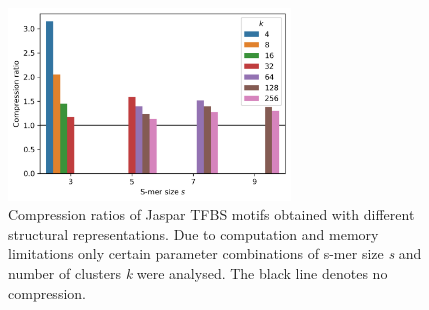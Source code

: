 \documentclass[10pt]{article}
\begin{document}
\begin{figure}[ht]
  \centering
  \includegraphics[width=7.5cm,keepaspectratio]{smer_fig_compression.png}
  \caption{Compression ratios of Jaspar TFBS motifs obtained with different structural representations. Due to computation and memory limitations only certain parameter combinations of s-mer size \textit{s} and number of clusters \textit{k} were analysed. The black line denotes no compression.}
\end{figure}
\end{document}
